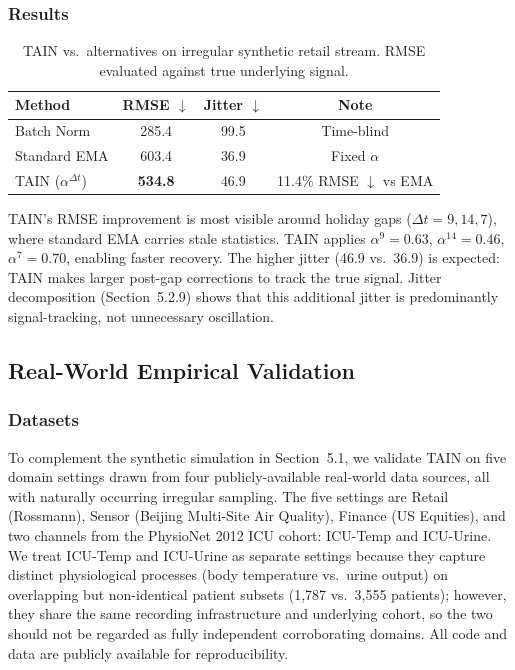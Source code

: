 \documentclass[11pt,a4paper]{article}
\begin{document}
\subsubsection{Results}

\begin{table}[h]
\centering
\caption{TAIN vs.\ alternatives on irregular synthetic retail stream. RMSE
  evaluated against true underlying signal.}
\vspace{4pt}
\begin{tabular}{lccc}
\toprule
\textbf{Method} & \textbf{RMSE} $\downarrow$ & \textbf{Jitter} $\downarrow$ & \textbf{Note} \\
\midrule
Batch Norm      & 285.4 & 99.5 & Time-blind \\
Standard EMA    & 603.4 & 36.9 & Fixed $\alpha$ \\
TAIN ($\alpha^{\Delta t}$) & \textbf{534.8} & 46.9 & 11.4\% RMSE $\downarrow$ vs EMA \\
\bottomrule
\end{tabular}
\end{table}

TAIN's RMSE improvement is most visible around holiday gaps ($\Delta t = 9, 14, 7$),
where standard EMA carries stale statistics. TAIN applies
$\alpha^9 = 0.63$, $\alpha^{14} = 0.46$, $\alpha^7 = 0.70$, enabling faster
recovery. The higher jitter (46.9 vs.\ 36.9) is expected: TAIN makes larger
post-gap corrections to track the true signal. Jitter decomposition
(Section~5.2.9) shows that this additional jitter is predominantly
signal-tracking, not unnecessary oscillation.

\subsection{Real-World Empirical Validation}
\label{sec:realworld}

\subsubsection{Datasets}

To complement the synthetic simulation in Section~5.1, we validate TAIN on five
domain settings drawn from four publicly-available real-world data sources, all
with naturally occurring irregular sampling. The five settings are Retail
(Rossmann), Sensor (Beijing Multi-Site Air Quality), Finance (US Equities),
and two channels from the PhysioNet 2012 ICU cohort: ICU-Temp and ICU-Urine.
We treat ICU-Temp and ICU-Urine as separate settings because they capture
distinct physiological processes (body temperature vs.\ urine output) on
overlapping but non-identical patient subsets (1{,}787 vs.\ 3{,}555 patients);
however, they share the same recording infrastructure and underlying cohort,
so the two should not be regarded as fully independent corroborating
domains. All code and data are publicly available for reproducibility.
\end{document}

